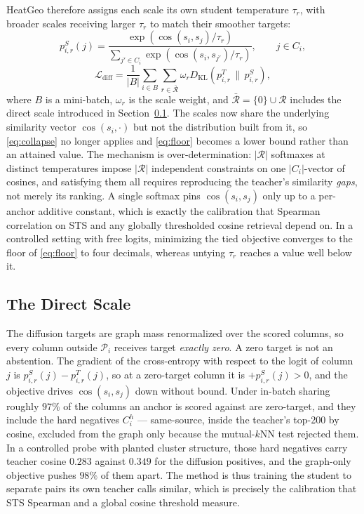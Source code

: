 HeatGeo therefore assigns each scale its own student temperature $\tau_r$, with broader scales receiving larger $\tau_r$ to match their smoother targets:
\begin{equation}
    p_{i,r}^{S}(j)
    =
    \frac{\exp(\cos(s_i,s_j)/\tau_r)}
    {\sum_{j'\in C_i}\exp(\cos(s_i,s_{j'})/\tau_r)},
    \qquad j\in C_i,
\end{equation}
\begin{equation}
    \mathcal{L}_{\mathrm{diff}}
    =
    \frac{1}{|B|}
    \sum_{i\in B}
    \sum_{r\in\bar{\mathcal{R}}}
    \omega_r
    D_{\mathrm{KL}}
    \left(
        p_{i,r}^{T} \,\|\, p_{i,r}^{S}
    \right),
\end{equation}
where $B$ is a mini-batch, $\omega_r$ is the scale weight, and $\bar{\mathcal{R}}=\{0\}\cup\mathcal{R}$ includes the direct scale introduced in Section~\ref{sec:direct}. The scales now share the underlying similarity vector $\cos(s_i,\cdot)$ but not the distribution built from it, so \eqref{eq:collapse} no longer applies and \eqref{eq:floor} becomes a lower bound rather than an attained value. The mechanism is over-determination: $|\mathcal{R}|$ softmaxes at distinct temperatures impose $|\mathcal{R}|$ independent constraints on one $|C_i|$-vector of cosines, and satisfying them all requires reproducing the teacher's similarity \emph{gaps}, not merely its ranking. A single softmax pins $\cos(s_i,s_j)$ only up to a per-anchor additive constant, which is exactly the calibration that Spearman correlation on STS and any globally thresholded cosine retrieval depend on. In a controlled setting with free logits, minimizing the tied objective converges to the floor of \eqref{eq:floor} to four decimals, whereas untying $\tau_r$ reaches a value well below it.

\subsection{The Direct Scale}
\label{sec:direct}

The diffusion targets are graph mass renormalized over the scored columns, so every column outside $\mathcal{P}_i$ receives target \emph{exactly zero}. A zero target is not an abstention. The gradient of the cross-entropy with respect to the logit of column $j$ is $p_{i,r}^S(j)-p_{i,r}^T(j)$, so at a zero-target column it is $+p^S_{i,r}(j)>0$, and the objective drives $\cos(s_i,s_j)$ down without bound. Under in-batch sharing roughly $97\%$ of the columns an anchor is scored against are zero-target, and they include the hard negatives $C_i^h$ --- same-source, inside the teacher's top-200 by cosine, excluded from the graph only because the mutual-$k$NN test rejected them. In a controlled probe with planted cluster structure, those hard negatives carry teacher cosine $0.283$ against $0.349$ for the diffusion positives, and the graph-only objective pushes $98\%$ of them apart. The method is thus training the student to separate pairs its own teacher calls similar, which is precisely the calibration that STS Spearman and a global cosine threshold measure.

